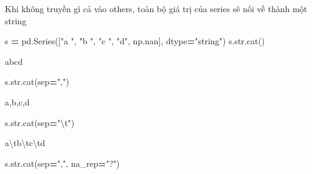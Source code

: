 \documentclass[
]{book}
\newenvironment{Shaded}{\begin{snugshade}}{\end{snugshade}}
\newcommand{\BuiltInTok}[1]{#1}
\newcommand{\CharTok}[1]{\textcolor[rgb]{0.31,0.60,0.02}{#1}}
\newcommand{\NormalTok}[1]{#1}
\newcommand{\OperatorTok}[1]{\textcolor[rgb]{0.81,0.36,0.00}{\textbf{#1}}}
\newcommand{\StringTok}[1]{\textcolor[rgb]{0.31,0.60,0.02}{#1}}
\begin{document}
Khi không truyền gì cả vào others, toàn bộ giá trị của series sẽ nối về thành một string\hspace{0pt}

\begin{Shaded}
\begin{Highlighting}[]
\NormalTok{s }\OperatorTok{=}\NormalTok{ pd.Series([}\StringTok{"a "}\NormalTok{, }\StringTok{"b "}\NormalTok{, }\StringTok{"c "}\NormalTok{, }\StringTok{"d"}\NormalTok{, np.nan], dtype}\OperatorTok{=}\StringTok{"string"}\NormalTok{)​}
\NormalTok{s.}\BuiltInTok{str}\NormalTok{.cat()​}
\end{Highlighting}
\end{Shaded}

\begin{Shaded}
\begin{Highlighting}[]
\NormalTok{\textquotesingle{}abcd\textquotesingle{}}
\end{Highlighting}
\end{Shaded}

\begin{Shaded}
\begin{Highlighting}[]
\NormalTok{s.}\BuiltInTok{str}\NormalTok{.cat(sep}\OperatorTok{=}\StringTok{","}\NormalTok{)}
\end{Highlighting}
\end{Shaded}

\begin{Shaded}
\begin{Highlighting}[]
\NormalTok{\textquotesingle{}a,b,c,d\textquotesingle{}}
\end{Highlighting}
\end{Shaded}

\begin{Shaded}
\begin{Highlighting}[]
\NormalTok{s.}\BuiltInTok{str}\NormalTok{.cat(sep}\OperatorTok{=}\StringTok{"}\CharTok{\textbackslash{}t}\StringTok{"}\NormalTok{) }
\end{Highlighting}
\end{Shaded}

\begin{Shaded}
\begin{Highlighting}[]
\NormalTok{\textquotesingle{}a\textbackslash{}tb\textbackslash{}tc\textbackslash{}td\textquotesingle{}}
\end{Highlighting}
\end{Shaded}

\begin{Shaded}
\begin{Highlighting}[]
\NormalTok{s.}\BuiltInTok{str}\NormalTok{.cat(sep}\OperatorTok{=}\StringTok{","}\NormalTok{, na\_rep}\OperatorTok{=}\StringTok{"?"}\NormalTok{)}
\end{Highlighting}
\end{Shaded}
\end{document}
